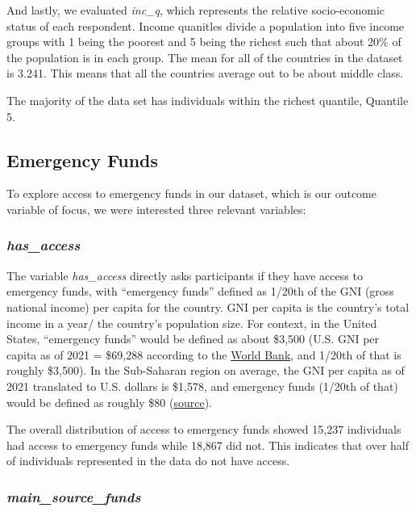\documentclass[water,article,submit,moreauthors,pdftex]{mdpi}
\begin{document}
And lastly, we evaluated \emph{inc\_q}, which represents the relative
socio-economic status of each respondent. Income quanitles divide a
population into five income groups with 1 being the poorest and 5 being
the richest such that about 20\% of the population is in each group. The
mean for all of the countries in the dataset is 3.241. This means that
all the countries average out to be about middle class.

The majority of the data set has individuals within the richest
quantile, Quantile 5.

\hypertarget{emergency-funds}{%
\subsection{Emergency Funds}\label{emergency-funds}}

To explore access to emergency funds in our dataset, which is our
outcome variable of focus, we were interested three relevant variables:

\hypertarget{has_access}{%
\subsubsection{\texorpdfstring{\emph{has\_access}}{has\_access}}\label{has_access}}

The variable \emph{has\_access} directly asks participants if they have
access to emergency funds, with ``emergency funds'' defined as 1/20th of
the GNI (gross national income) per capita for the country. GNI per
capita is the country's total income in a year/ the country's population
size. For context, in the United States, ``emergency funds'' would be
defined as about \$3,500 (U.S. GNI per capita as of 2021 = \$69,288
according to the
\href{https://data.worldbank.org/country/united-states?view=chart}{World
Bank}, and 1/20th of that is roughly \$3,500). In the Sub-Saharan region
on average, the GNI per capita as of 2021 translated to U.S. dollars is
\$1,578, and emergency funds (1/20th of that) would be defined as
roughly \$80
(\href{https://data.worldbank.org/indicator/NY.GNP.PCAP.CD?locations=ZG}{source}).

The overall distribution of access to emergency funds showed 15,237
individuals had access to emergency funds while 18,867 did not. This
indicates that over half of individuals represented in the data do not
have access.

\hypertarget{main_source_funds}{%
\subsubsection{\texorpdfstring{\emph{main\_source\_funds}}{main\_source\_funds}}\label{main_source_funds}}
\end{document}
